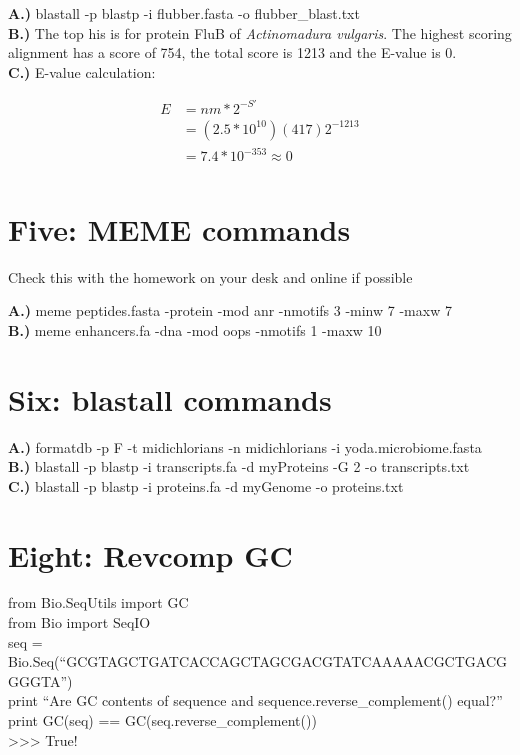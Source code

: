 \documentclass[10pt]{article} %
\begin{document}
\textbf{A.)} blastall -p blastp -i flubber.fasta -o flubber\_blast.txt\\
\textbf{B.)} The top his is for protein FluB of \textit{Actinomadura vulgaris}.
The highest scoring alignment has a score of 754, the total score is 1213 and the
E-value is 0.\\
\textbf{C.)} E-value calculation:

\begin{align*}
  E &= nm*2^{-S'}\\
  &= (2.5*10^{10})(417)2^{-1213}\\
  &= 7.4*10^{-353} \approx 0\\
\end{align*}

\section{Five: MEME commands}

Check this with the homework on your desk and online if possible

\textbf{A.)} meme peptides.fasta -protein -mod anr -nmotifs 3 -minw 7 -maxw 7\\
\textbf{B.)} meme enhancers.fa -dna -mod oops -nmotifs 1 -maxw 10\\

\section{Six: blastall commands}
\textbf{A.)} formatdb -p F -t midichlorians -n midichlorians -i yoda.microbiome.fasta\\
\textbf{B.)} blastall -p blastp -i transcripts.fa -d myProteins -G 2 -o transcripts.txt\\
\textbf{C.)} blastall -p blastp -i proteins.fa -d myGenome -o proteins.txt\\

\section{Eight: Revcomp GC}
from Bio.SeqUtils import GC\\
from Bio import SeqIO\\
seq = Bio.Seq(``GCGTAGCTGATCACCAGCTAGCGACGTATCAAAAACGCTGACGGGGTA'')\\
print ``Are GC contents of sequence and sequence.reverse\_complement() equal?''\\
print GC(seq) == GC(seq.reverse\_complement())\\
>>> True!\\
\end{document}

